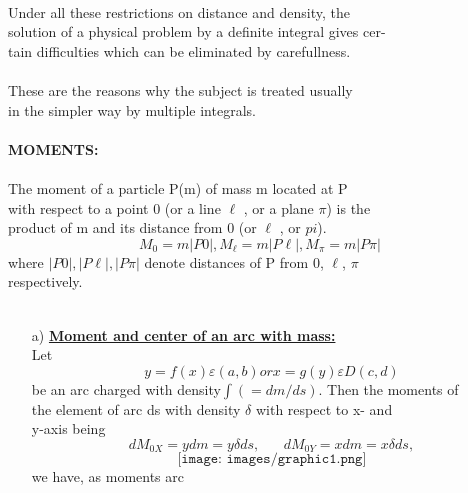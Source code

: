 \documentclass[12pt,a4paper]{article}
\begin{document}
	\paragraph{}  
	    Under all these restrictions on distance and density, the \\
	    solution of a 	physical problem by 	a definite integral gives cer-\\
	    tain difficulties which can be eliminated by carefullness.
	\paragraph{} 
	    These are the reasons why the subject is treated usually \\
	    in the simpler way by multiple integrals.\\ \\
	\textbf{MOMENTS:}  
		\paragraph{} 
		    The moment of a particle P(m) of mass m located at P\\
	    	with respect to a point 0 (or a line $\ell$ , or a plane $\pi$) is the\\
	    	product of m and its distance from 0 (or $\ell$ , or $pi$). $$ M_0 = m |P0|,  M_\ell = m|P\ell|, M_\pi = m|P\pi| $$ where $|P0|, |P\ell|, |P\pi|$ denote distances of P from 0, $\ell$, $\pi$ \\respectively.\\ \\
	
	    \begin{enumerate}
	        \item [a)]\textbf{ \underline{Moment and center of an arc with mass:}}\\ 
	  Let $$y=f(x)\varepsilon(a, b)   or   x=g(y)\varepsilon D(c, d) $$ be an arc charged with density$\int (=dm/ds )$.  Then the moments of\\
	   the element of arc ds with density $\delta$ with respect to x- and\\
	 y-axis being $$d M_{0X}=y dm = y \delta ds, \hspace{20pt}  d M_{0Y} = x dm = x\delta ds,$$ $$\texttt{[image: images/graphic1.png]}$$ we have, as moments arc
	       \end{enumerate}
\end{document}
